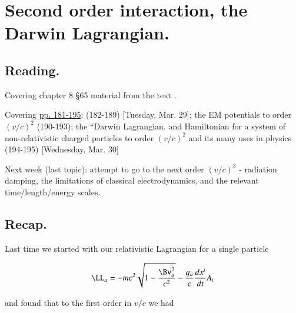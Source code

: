 %
%

\chapter{Second order interaction, the Darwin Lagrangian.}
\label{chap:relativisticElectrodynamicsL25}
{}
\date{Mar 31, 2011}

\beginArtNoToc

\section{Reading.}

Covering chapter 8 \S 65 material from the text \citep{landau1980classical}.

Covering \href{http://www.physics.utoronto.ca/~poppitz/epoppitz/PHY450_files/RelEMpp181-195.pdf}{pp. 181-195}: (182-189) [Tuesday, Mar. 29]; the EM potentials to order $(v/c)^2$ (190-193); the ``Darwin Lagrangian.  and Hamiltonian for a system of non-relativistic charged particles to order $(v/c)^2$ and its many uses in physics (194-195) [Wednesday, Mar. 30]

Next week (last topic): attempt to go to the next order $(v/c)^3$ - radiation damping, the limitations of classical electrodynamics, and the relevant time/length/energy scales.

\section{Recap.}

Last time we started with our relativistic Lagrangian for a single particle

\begin{equation}\label{eqn:relativisticElectrodynamicsL25:n}
\LL_a = - m c^2 \sqrt{ 1 - \frac{\Bv_a^2}{c^2} } - \frac{q_a}{c} \frac{dx^i}{dt} A_i
\end{equation}

and found that to the first order in $v/c$ we had


